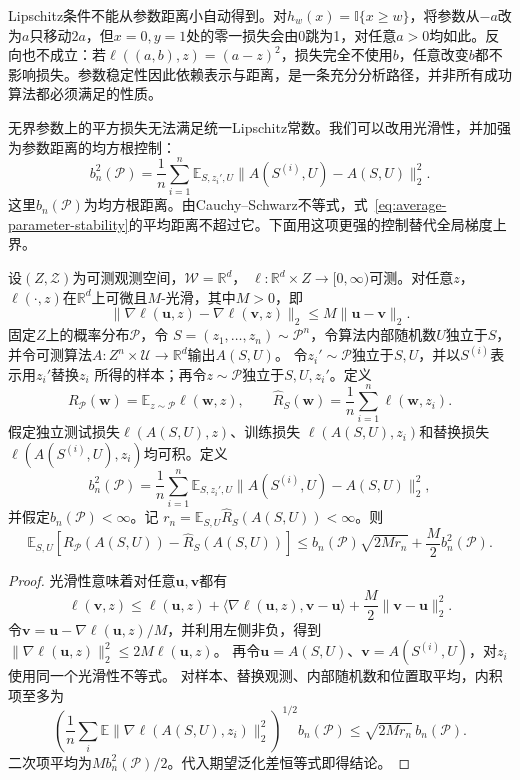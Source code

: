 Lipschitz条件不能从参数距离小自动得到。对$h_w(x)=\mathbb I\{x\geq w\}$，将参数从$-a$改为$a$只移动$2a$，但$x=0,y=1$处的零一损失会由0跳为1，对任意$a>0$均如此。反向也不成立：若$\ell((a,b),z)=(a-z)^2$，损失完全不使用$b$，任意改变$b$都不影响损失。参数稳定性因此依赖表示与距离，是一条充分分析路径，并非所有成功算法都必须满足的性质。

无界参数上的平方损失无法满足统一Lipschitz常数。我们可以改用光滑性，并加强为参数距离的均方根控制：
\[
 b_n^2(\mathcal P)
 =\frac1n\sum_{i=1}^n\mathbb E_{S,z_i',U}
       \|A(S^{(i)},U)-A(S,U)\|_2^2.
\]
这里$b_n(\mathcal P)$为均方根距离。由Cauchy--Schwarz不等式，式~\eqref{eq:average-parameter-stability}的平均距离不超过它。下面用这项更强的控制替代全局梯度上界。

\begin{theorem}[光滑损失下参数稳定性与期望泛化差]
\label{thm:smooth-parameter-generalization}
设$(Z,\mathcal Z)$为可测观测空间，$\mathcal W=\mathbb R^d$，
$\ell:\mathbb R^d\times Z\to[0,\infty)$可测。对任意$z$，
$\ell(\cdot,z)$在$\mathbb R^d$上可微且$M$-光滑，其中$M>0$，即
\[
 \|\nabla\ell(\bm u,z)-\nabla\ell(\bm v,z)\|_2
 \leq M\|\bm u-\bm v\|_2.
\]
固定$Z$上的概率分布$\mathcal P$，令
$S=(z_1,\ldots,z_n)\sim\mathcal P^n$，令算法内部随机数$U$独立于$S$，
并令可测算法$A:Z^n\times\mathcal U\to\mathbb R^d$输出$A(S,U)$。
令$z_i'\sim\mathcal P$独立于$S,U$，并以$S^{(i)}$表示用$z_i'$替换$z_i$
所得的样本；再令$z\sim\mathcal P$独立于$S,U,z_i'$。定义
\[
 R_{\mathcal P}(\bm w)=\mathbb E_{z\sim\mathcal P}\ell(\bm w,z),
 \qquad
 \hat R_S(\bm w)=\frac1n\sum_{i=1}^n\ell(\bm w,z_i).
\]
假定独立测试损失$\ell(A(S,U),z)$、训练损失
$\ell(A(S,U),z_i)$和替换损失$\ell(A(S^{(i)},U),z_i)$均可积。定义
\[
 b_n^2(\mathcal P)
 =\frac1n\sum_{i=1}^n\mathbb E_{S,z_i',U}
 \|A(S^{(i)},U)-A(S,U)\|_2^2,
\]
并假定$b_n(\mathcal P)<\infty$。记
$r_n=\mathbb E_{S,U}\hat R_S(A(S,U))<\infty$。则
\begin{equation}
 \mathbb E_{S,U}[R_{\mathcal P}(A(S,U))-\hat R_S(A(S,U))]
 \leq b_n(\mathcal P)\sqrt{2Mr_n}+\frac M2 b_n^2(\mathcal P).
 \label{eq:smooth-parameter-generalization}
\end{equation}
\end{theorem}
\begin{proof}
光滑性意味着对任意$\bm u,\bm v$都有
\[
 \ell(\bm v,z)\leq\ell(\bm u,z)
 +\langle\nabla\ell(\bm u,z),\bm v-\bm u\rangle
 +\frac M2\|\bm v-\bm u\|_2^2.
\]
令$\bm v=\bm u-\nabla\ell(\bm u,z)/M$，并利用左侧非负，得到
$\|\nabla\ell(\bm u,z)\|_2^2\leq2M\ell(\bm u,z)$。
再令$\bm u=A(S,U)$、$\bm v=A(S^{(i)},U)$，对$z_i$使用同一个光滑性不等式。
对样本、替换观测、内部随机数和位置取平均，内积项至多为
\[
 \left(\frac1n\sum_i\mathbb E\|\nabla\ell(A(S,U),z_i)\|_2^2\right)^{1/2}
 b_n(\mathcal P)
 \leq\sqrt{2Mr_n}\,b_n(\mathcal P).
\]
二次项平均为$Mb_n^2(\mathcal P)/2$。代入期望泛化差恒等式即得结论。
\end{proof}

